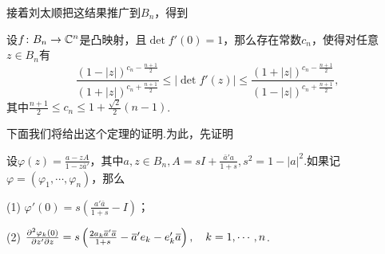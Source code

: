 接着刘太顺\cite{刘太顺1999n}把这结果推广到$B_n$，得到
\begin{theorem}\label{thm2.7.1}
	设$f\colon B_n\to\mathbb C^n$是凸映射，且$\det f'(0)=1$，那么存在常数$c_n$，使得对任意$z\in B_n$有
	\[\frac{(1-|z|)^{c_n-\frac{n+1}{2}}}{(1+|z|)^{c_n+\frac{n+1}{2}}}\le|\det f'(z)|\le\frac{(1+|z|)^{c_n-\frac{n+1}{2}}}{(1-|z|)^{c_n+\frac{n+1}{2}}},\]
	其中$\frac{n+1}{2}\le c_n\le 1+\frac{\sqrt{2}}{2}(n-1)$.
\end{theorem}
下面我们将给出这个定理的证明.为此，先证明
\begin{lemma}\label{lem2.7.2}
	设$\varphi(z)=\frac{a-zA}{1-z\bar{a}'}$，其中$a,z\in B_n,A=sI+\frac{\bar{a}'a}{1+s},s^2=1-|a|^2$.如果记$\varphi=(\varphi_1,\cdots,\varphi_n)$，那么
	
	(1)\hypertarget{2.7.2}{}
	$\varphi'(0)=s\left(\frac{a'\bar{a}}{1+s}-I\right)$；
	
	(2)\hypertarget{2.7.2}{}
	$\frac{\partial^2 \varphi_k(0)}{\partial z'\partial z}=s\left(\frac{2a_k{}\mkern1mu\overline{\mkern-1mua}'{}\mkern1mu\overline{\mkern-1mua}}{1+s}-{}\mkern1mu\overline{\mkern-1mua}'e_k-e_k'{}\mkern1mu\overline{\mkern-1mua}\right),\quad k=1,\cdots,n$.
\end{lemma}
